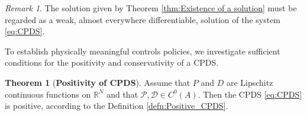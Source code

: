 \documentclass[10pt]{article}
\theoremstyle{remark}
\newtheorem{remark}{Remark}[section]
\theoremstyle{definition}
\newtheorem{thm}{Theorem}
\theoremstyle{remark}
\begin{document}
\begin{remark}
    The solution given by Theorem \ref{thm:Existence of a solution} must be regarded as a weak, almost everywhere differentiable, solution of the system \eqref{eq:CPDS}.
\end{remark}

To establish physically meaningful controls policies, we investigate sufficient conditions for the positivity and conservativity of a CPDS.

\begin{thm}[\textbf{Positivity of CPDS}]\label{thm:Positive_CPDS}
    Assume that $P$ and $D$ are Lipschitz continuous functions on $\mathbb{R}^N$ and that $\mathcal{P},\mathcal{D}\in C^0(A).$ Then the CPDS  \eqref{eq:CPDS} is positive, according to the Definition \ref{defn:Positive_CPDS}.
\end{thm}
\end{document}

